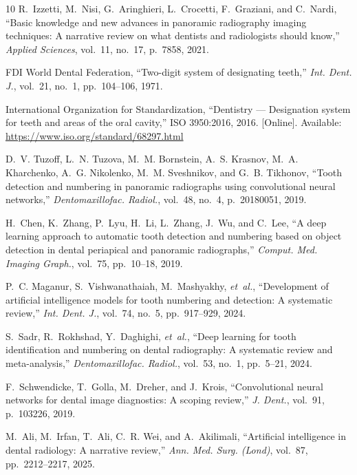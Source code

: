 \documentclass[10pt,journal,compsoc]{IEEEtran}
\begin{document}

\begin{thebibliography}{10}
R.~Izzetti, M.~Nisi, G.~Aringhieri, L.~Crocetti, F.~Graziani, and C.~Nardi, ``Basic knowledge and new advances in panoramic radiography imaging techniques: A narrative review on what dentists and radiologists should know,'' \textit{Applied Sciences}, vol.~11, no.~17, p.~7858, 2021.

FDI World Dental Federation, ``Two-digit system of designating teeth,'' \textit{Int. Dent. J.}, vol.~21, no.~1, pp.~104--106, 1971.

International Organization for Standardization, ``Dentistry --- Designation system for teeth and areas of the oral cavity,'' ISO 3950:2016, 2016. [Online]. Available: \url{https://www.iso.org/standard/68297.html}

D.~V. Tuzoff, L.~N. Tuzova, M.~M. Bornstein, A.~S. Krasnov, M.~A. Kharchenko, A.~G. Nikolenko, M.~M. Sveshnikov, and G.~B. Tikhonov, ``Tooth detection and numbering in panoramic radiographs using convolutional neural networks,'' \textit{Dentomaxillofac. Radiol.}, vol.~48, no.~4, p.~20180051, 2019.

H.~Chen, K.~Zhang, P.~Lyu, H.~Li, L.~Zhang, J.~Wu, and C.~Lee, ``A deep learning approach to automatic tooth detection and numbering based on object detection in dental periapical and panoramic radiographs,'' \textit{Comput. Med. Imaging Graph.}, vol.~75, pp.~10--18, 2019.

P.~C. Maganur, S.~Vishwanathaiah, M.~Mashyakhy, \textit{et~al.}, ``Development of artificial intelligence models for tooth numbering and detection: A systematic review,'' \textit{Int. Dent. J.}, vol.~74, no.~5, pp.~917--929, 2024.

S.~Sadr, R.~Rokhshad, Y.~Daghighi, \textit{et~al.}, ``Deep learning for tooth identification and numbering on dental radiography: A systematic review and meta-analysis,'' \textit{Dentomaxillofac. Radiol.}, vol.~53, no.~1, pp.~5--21, 2024.

F.~Schwendicke, T.~Golla, M.~Dreher, and J.~Krois, ``Convolutional neural networks for dental image diagnostics: A scoping review,'' \textit{J. Dent.}, vol.~91, p.~103226, 2019.

M.~Ali, M.~Irfan, T.~Ali, C.~R. Wei, and A.~Akilimali, ``Artificial intelligence in dental radiology: A narrative review,'' \textit{Ann. Med. Surg. (Lond)}, vol.~87, pp.~2212--2217, 2025.


\end{thebibliography}
\end{document}
